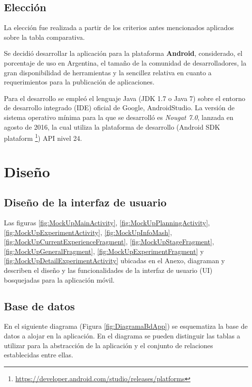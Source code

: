     
    \subsection{Elección}
    \par
    La elección fue realizada a partir de los criterios antes mencionados aplicados sobre la tabla comparativa.
    \par
    Se decidió desarrollar la aplicación para la plataforma \textbf{Android}, considerado, el porcentaje de uso en Argentina, el tamaño de la comunidad de desarrolladores, la gran disponibilidad de herramientas y la sencillez relativa en cuanto a requerimientos para la publicación de aplicaciones.
    
    \par Para el desarrollo se empleó el lenguaje Java (JDK 1.7 o Java 7) sobre el entorno de desarrollo integrado (IDE) oficial de Google, AndroidStudio. La versión de sistema operativo mínima para la que se desarrolló es \textit{Nougat 7.0}, lanzada en agosto de 2016, la cual utiliza la plataforma de desarrollo (Android SDK plataform \footnote{\url{https://developer.android.com/studio/releases/platforms}}) API nivel 24.

    
    
\section{Diseño}
    \subsection{Diseño de la interfaz de usuario}
        \par Las figuras \ref{fig:MockUpMainActivity}, \ref{fig:MockUpPlanningActivity}, \ref{fig:MockUpExperimentActivity}, \ref{fig:MockUpInfoMash}, \ref{fig:MockUpCurrentExperienceFragment}, \ref{fig:MockUpStageFragment}, \ref{fig:MockUpGeneralFragment}, \ref{fig:MockUpExperimentFragment} y \ref{fig:MockUpDetailExperimentActivity} ubicadas en el Anexo, diagraman y describen el diseño y las funcionalidades de la interfaz de usuario (UI) bosquejadas para la aplicación móvil.

    \subsection{Base de datos}
        \par En el siguiente diagrama (Figura \ref{fig:DiagramaBdApp}) se esquematiza la base de datos a alojar en la aplicación. En el diagrama se pueden distinguir las tablas a utilizar para la abstracción de la aplicación y el conjunto de relaciones establecidas entre ellas.
        
